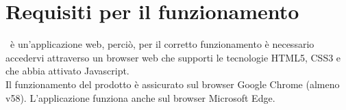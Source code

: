 \documentclass[../ManualeUtente.tex]{subfiles}
\begin{document}
	\section{Requisiti per il funzionamento}
		\progetto\ è un'applicazione web, perciò, per il corretto funzionamento
		è necessario accedervi attraverso un browser web che supporti le
		tecnologie HTML5, CSS3 e che abbia attivato Javascript.\\
		Il funzionamento del prodotto è assicurato sul browser Google Chrome (almeno v58).
		L'applicazione funziona anche sul browser Microsoft Edge.
\end{document}
